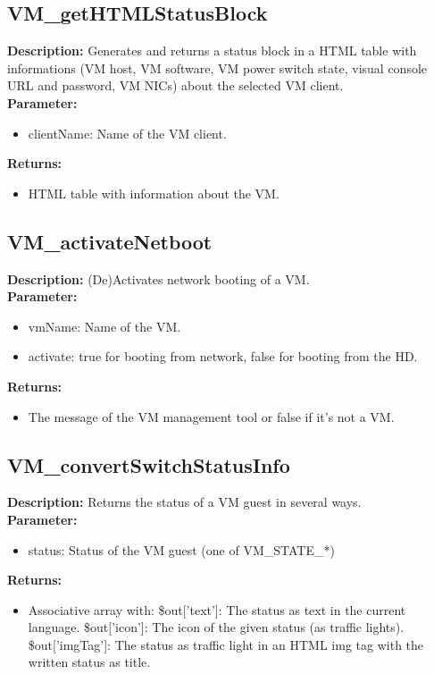 \subsection{VM\_getHTMLStatusBlock}
\textbf{Description:} Generates and returns a status block in a HTML table with informations (VM host, VM software, VM power switch state, visual console URL and password, VM NICs) about the selected VM client.\\
\textbf{Parameter:}
\begin{itemize}
\item clientName: Name of the VM client.
\end{itemize}
\textbf{Returns:}
\begin{itemize}
\item HTML table with information about the VM.
\end{itemize}

\subsection{VM\_activateNetboot}
\textbf{Description:} (De)Activates network booting of a VM.\\
\textbf{Parameter:}
\begin{itemize}
\item vmName: Name of the VM.
\item activate: true for booting from network, false for booting from the HD.
\end{itemize}
\textbf{Returns:}
\begin{itemize}
\item The message of the VM management tool or false if it's not a VM.
\end{itemize}

\subsection{VM\_convertSwitchStatusInfo}
\textbf{Description:} Returns the status of a VM guest in several ways.\\
\textbf{Parameter:}
\begin{itemize}
\item status: Status of the VM guest (one of VM\_STATE\_*)
\end{itemize}
\textbf{Returns:}
\begin{itemize}
\item Associative array with: \$out['text']: The status as text in the current language. \$out['icon']: The icon of the given status (as traffic lights). \$out['imgTag']: The status as traffic light in an HTML img tag with the written status as title.
\end{itemize}

